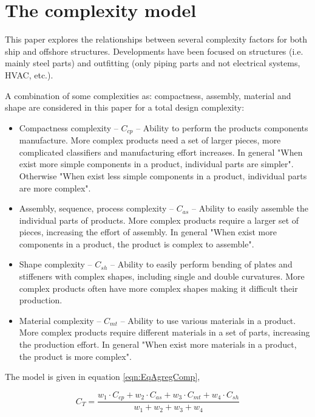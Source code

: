 \section{The complexity model}
This paper explores the relationships between several complexity factors for both ship and offshore structures. Developments have been focused on structures (i.e. mainly steel parts) and outfitting (only piping parts and not electrical systems, HVAC, etc.).


A combination of some complexities as: compactness, assembly, material and shape are considered in this paper for a total design complexity:
\begin{itemize}
\item Compactness complexity -- $C_{cp}$ -- Ability to perform the products components manufacture. More complex products need a set of larger pieces, more complicated classifiers and manufacturing effort increases. In general "When exist more simple components in a product, individual parts are simpler". Otherwise "When exist less simple components in a product, individual parts are more complex".
\item Assembly, sequence, process complexity -- $C_{as}$ -- Ability to easily assemble the individual parts of products. More complex products require a larger set of pieces, increasing the effort of assembly. In general "When exist more components in a product, the product is complex to assemble". 
\item Shape complexity -- $C_{sh}$ -- Ability to easily perform bending of plates and stiffeners with complex shapes, including single and double curvatures. More complex products often have more complex shapes making it difficult their production.
\item Material complexity -- $C_{mt}$ -- Ability to use various materials in a product. More complex products require different materials in a set of parts, increasing the production effort. In general "When exist more materials in a product, the product is more complex".
\end{itemize}

The model is given in equation \ref{eqn:EqAgregComp}, %

\begin{equation}
\label{eqn:EqAgregComp}
C_T = \frac{w_1 \cdot C_{cp} + w_2 \cdot C_{as} + w_3 \cdot C_{mt} + w_4 \cdot C_{sh} }{w_1 + w_2 + w_3 + w_4}
\end{equation}

